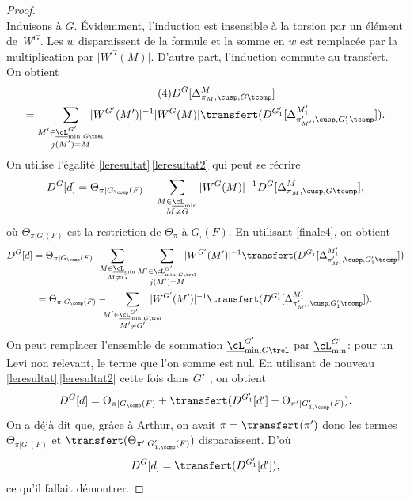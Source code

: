 \begin{proof}
\[\]
Induisons à $G$. Évidemment, l'induction est insensible à la torsion par un élément de~$W^G$. Les $w$ disparaissent de la formule et la somme en $w$ est remplacée par la multiplication par $\vert W^G(M)\vert $. D'autre part, l'induction commute au transfert. On obtient
\begin{multline*}\tag{4}\label{finale4}
D^G[\Delta^M_{\pi_{M},\cusp,G\tcomp}]\\
= \sum_{\substack{M'\in \underline{\cL}_{\min,G\trel}^{G'}\\ j(M')=M}}\hspace*{-5mm}\vert W^{G'}(M')\vert ^{-1}\vert W^G(M)\vert \transfert(D^{G'_{1}}[\Delta^{M'_{1}}_{\pi'_{M'},\cusp,G'_{1}\tcomp}]).
\end{multline*}
On utilise l'égalité \ref{leresultat}\,\eqref{leresultat2} qui
peut se récrire
\[
D^G[d]= \Theta_{\pi\vert G_{\comp}(F)}-\sum_{\substack{M\in \underline{\cL}_{\min}\\M\neq G}}\vert W^G(M)\vert ^{-1}D^G[\Delta^M_{\pi_{M},\cusp,G\tcomp}],
\]
où $ \Theta_{\pi\vert G_{\comp}(F)}$ est la restriction de $\Theta_{\pi}$ à $G_{\comp}(F)$.
En utilisant \eqref{finale4}, on obtient
\begin{multline*}
D^G[d]
= \Theta_{\pi\vert G_{\comp}(F)}-\hspace*{-2mm}\sum_{\substack{M\in \underline{\cL}_{\min}\\M\neq G}}\sum_{\substack{M'\in \underline{\cL}_{\min,G\trel}^{G'}\\ j(M')=M}}\hspace*{-5mm}\vert W^{G'}(M')\vert ^{-1}
\transfert(D^{G'_{1}}[\Delta^{M'_{1}}_{\pi'_{M'},\cusp,G'_{1}\tcomp}])
\\
=\Theta_{\pi\vert G_{\comp}(F)}-\hspace*{-2mm}\sum_{\substack{M'\in \underline{\cL}_{\min,G\trel}^{G'}\\ M'\neq G'}}\hspace*{-5mm}\vert W^{G'}(M')\vert ^{-1} \transfert(D^{G'_{1}}[\Delta^{M'_{1}}_{\pi'_{M'},\cusp,G'_{1}\tcomp}]).
\end{multline*}
On peut remplacer l'ensemble de sommation $ \underline{\cL}_{\min,G\trel}^{G'}$ par $ \underline{\cL}_{\min}^{G'}$: pour un Levi non relevant, le terme que l'on somme est nul.
En utilisant de nouveau \ref{leresultat}\,\eqref{leresultat2} cette fois dans $G'_{1}$, on obtient
\[
D^G[d]= \Theta_{\pi\vert G_{\comp}(F)}+\transfert(D^{G'_{1}}[d']-\Theta_{\pi'\vert G'_{1,\comp}(F)}).
\]
On a déjà dit que, grâce à Arthur, on avait $\pi=\transfert(\pi')$ donc les termes $\Theta_{\pi\vert G_{\comp}(F)}$ et $\transfert(\Theta_{\pi'\vert G'_{1,\comp}(F)})$ disparaissent. D'où
\[
D^G[d]= \transfert(D^{G'_{1}}[d']),
\]
ce qu'il fallait démontrer.
\end{proof}

\Changelback
